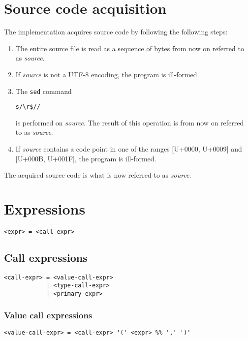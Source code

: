 \documentclass[12pt, oneside]{memoir}
\newcommand{\var}[1]{\emph{#1}}
\newcommand{\cp}[1]{U+#1}
\begin{document}
\chapter{Source code acquisition}

The implementation acquires source code by following the following steps:

\begin{enumerate}
  \item The entire source file is read as a sequence of bytes from now on
        referred to as \var{source}.
  \item If \var{source} is not a UTF-8 encoding, the program is ill-formed.
  \item The \texttt{sed} command
\begin{verbatim}
s/\r$//
\end{verbatim}
        is performed on \var{source}. The result of this operation is from now
        on referred to as \var{source}.
  \item If \var{source} contains a code point in one of the ranges
        [\cp{0000}, \cp{0009}] and [\cp{000B}, \cp{001F}], the program is
        ill-formed.
\end{enumerate}

The acquired source code is what is now referred to as \var{source}.

\chapter{Expressions}

\begin{verbatim}
<expr> = <call-expr>
\end{verbatim}

\section{Call expressions}

\begin{verbatim}
<call-expr> = <value-call-expr>
            | <type-call-expr>
            | <primary-expr>
\end{verbatim}

\subsection{Value call expressions}

\begin{verbatim}
<value-call-expr> = <call-expr> '(' <expr> %% ',' ')'
\end{verbatim}
\end{document}

